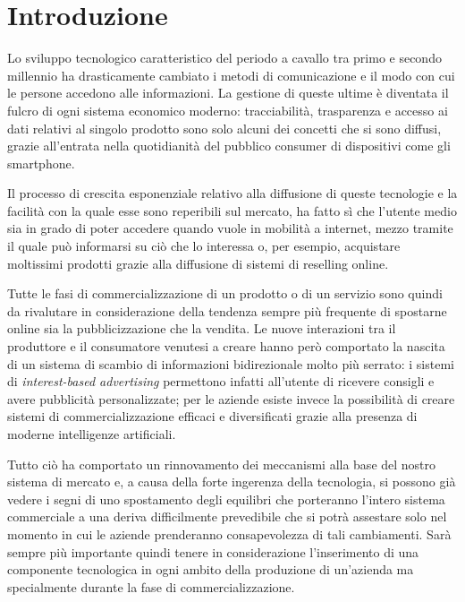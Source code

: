 
\chapter*{Introduzione}

Lo sviluppo tecnologico caratteristico del periodo a cavallo tra primo
e secondo millennio ha drasticamente cambiato i metodi di comunicazione
e il modo con cui le persone accedono alle informazioni. La gestione
di queste ultime è diventata il fulcro di ogni sistema economico moderno:
tracciabilità, trasparenza e accesso ai dati relativi al singolo prodotto
sono solo alcuni dei concetti che si sono diffusi, grazie all'entrata
nella quotidianità del pubblico consumer di dispositivi come gli smartphone.\medskip{}

Il processo di crescita esponenziale relativo alla diffusione di queste
tecnologie e la facilità con la quale esse sono reperibili sul mercato,
ha fatto sì che l'utente medio sia in grado di poter accedere quando
vuole in mobilità a internet, mezzo tramite il quale può informarsi
su ciò che lo interessa o, per esempio, acquistare moltissimi prodotti
grazie alla diffusione di sistemi di reselling online.

\medskip{}

Tutte le fasi di commercializzazione di un prodotto o di un servizio
sono quindi da rivalutare in considerazione della tendenza sempre
più frequente di spostarne online sia la pubblicizzazione che la vendita.
Le nuove interazioni tra il produttore e il consumatore venutesi a
creare hanno però comportato la nascita di un sistema di scambio di
informazioni bidirezionale molto più serrato: i sistemi di \emph{interest-based
advertising} permettono infatti all'utente di ricevere consigli e
avere pubblicità personalizzate; per le aziende esiste invece la possibilità
di creare sistemi di commercializzazione efficaci e diversificati
grazie alla presenza di moderne intelligenze artificiali.\medskip{}

Tutto ciò ha comportato un rinnovamento dei meccanismi alla base del
nostro sistema di mercato e, a causa della forte ingerenza della tecnologia,
si possono già vedere i segni di uno spostamento degli equilibri che
porteranno l’intero sistema commerciale a una deriva difficilmente
prevedibile che si potrà assestare solo nel momento in cui le aziende
prenderanno consapevolezza di tali cambiamenti. Sarà sempre più importante
quindi tenere in considerazione l’inserimento di una componente tecnologica
in ogni ambito della produzione di un’azienda ma specialmente durante
la fase di commercializzazione.

